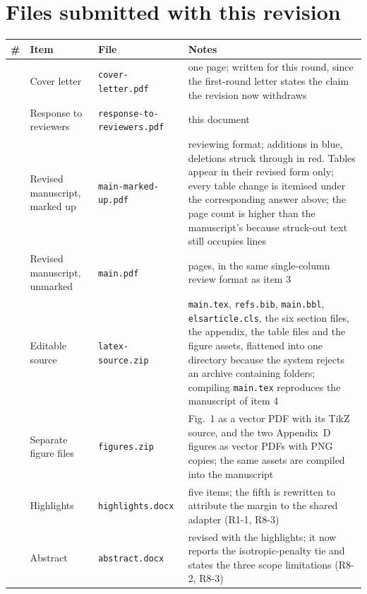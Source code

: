 \section{Files submitted with this revision}

\begin{center}\small
\begin{longtable}{@{}>{\raggedright\arraybackslash}p{0.6cm}>{\raggedright\arraybackslash}p{4.0cm}>{\raggedright\arraybackslash}p{4.4cm}>{\raggedright\arraybackslash}p{4.4cm}@{}}
\toprule
\# & Item & File & Notes \\
\midrule
\endhead
1 & Cover letter & \texttt{cover-letter.pdf} & one page; written for this round, since the
first-round letter states the claim the revision now withdraws \\
\addlinespace
2 & Response to reviewers & \texttt{response-to-\allowbreak reviewers.pdf} & this document \\
\addlinespace
3 & Revised manuscript, marked up & \texttt{main-marked-up.pdf} & reviewing format; additions in
blue, deletions struck through in red. Tables appear in their revised form only; every table
change is itemised under the corresponding answer above; the page count is higher than the
manuscript's because struck-out text still occupies lines \\
\addlinespace
4 & Revised manuscript, unmarked & \texttt{main.pdf} & 101 pages, in the same single-column
review format as item 3 \\
\addlinespace
5 & Editable source & \texttt{latex-source.zip} & \texttt{main.tex}, \texttt{refs.bib},
\texttt{main.bbl}, \texttt{elsarticle.cls}, the six section files, the appendix, the table
files and the figure assets, flattened into one directory because the system rejects an
archive containing folders; compiling \texttt{main.tex} reproduces the manuscript of item 4 \\
\addlinespace
6 & Separate figure files & \texttt{figures.zip} & Fig.~1 as a vector PDF with its TikZ source,
and the two Appendix~D figures as vector PDFs with PNG copies; the same assets are compiled
into the manuscript \\
\addlinespace
7 & Highlights & \texttt{highlights.docx} & five items; the fifth is rewritten to attribute the
margin to the shared adapter (R1-1, R8-3) \\
\addlinespace
8 & Abstract & \texttt{abstract.docx} & revised with the highlights; it now reports the
isotropic-penalty tie and states the three scope limitations (R8-2, R8-3) \\

\end{longtable}
\end{center}
